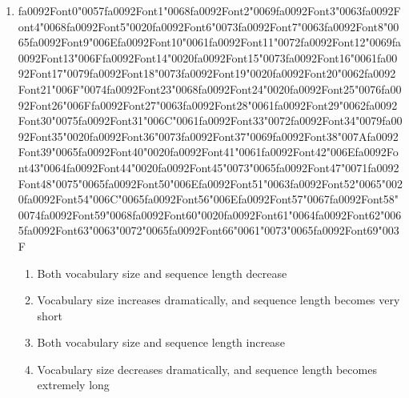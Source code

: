 \documentclass[12pt]{article}
\begin{document}
\begin{enumerate}[label=Q\arabic*.]
 \item {\csname fa0092Font0\endcsname\char"0057}{\csname fa0092Font1\endcsname\char"0068}{\csname fa0092Font2\endcsname\char"0069}{\csname fa0092Font3\endcsname\char"0063}{\csname fa0092Font4\endcsname\char"0068}{\csname fa0092Font5\endcsname\char"0020}{\csname fa0092Font6\endcsname\char"0073}{\csname fa0092Font7\endcsname\char"0063}{\csname fa0092Font8\endcsname\char"0065}{\csname fa0092Font9\endcsname\char"006E}{\csname fa0092Font10\endcsname\char"0061}{\csname fa0092Font11\endcsname\char"0072}{\csname fa0092Font12\endcsname\char"0069}{\csname fa0092Font13\endcsname\char"006F}{\csname fa0092Font14\endcsname\char"0020}{\csname fa0092Font15\endcsname\char"0073}{\csname fa0092Font16\endcsname\char"0061}{\csname fa0092Font17\endcsname\char"0079}{\csname fa0092Font18\endcsname\char"0073}{\csname fa0092Font19\endcsname\char"0020}{\csname fa0092Font20\endcsname\char"0062}{\csname fa0092Font21\endcsname\char"006F}{\char"0074}{\csname fa0092Font23\endcsname\char"0068}{\csname fa0092Font24\endcsname\char"0020}{\csname fa0092Font25\endcsname\char"0076}{\csname fa0092Font26\endcsname\char"006F}{\csname fa0092Font27\endcsname\char"0063}{\csname fa0092Font28\endcsname\char"0061}{\csname fa0092Font29\endcsname\char"0062}{\csname fa0092Font30\endcsname\char"0075}{\csname fa0092Font31\endcsname\char"006C}{\char"0061}{\csname fa0092Font33\endcsname\char"0072}{\csname fa0092Font34\endcsname\char"0079}{\csname fa0092Font35\endcsname\char"0020}{\csname fa0092Font36\endcsname\char"0073}{\csname fa0092Font37\endcsname\char"0069}{\csname fa0092Font38\endcsname\char"007A}{\csname fa0092Font39\endcsname\char"0065}{\csname fa0092Font40\endcsname\char"0020}{\csname fa0092Font41\endcsname\char"0061}{\csname fa0092Font42\endcsname\char"006E}{\csname fa0092Font43\endcsname\char"0064}{\csname fa0092Font44\endcsname\char"0020}{\csname fa0092Font45\endcsname\char"0073}{\char"0065}{\csname fa0092Font47\endcsname\char"0071}{\csname fa0092Font48\endcsname\char"0075}{\char"0065}{\csname fa0092Font50\endcsname\char"006E}{\csname fa0092Font51\endcsname\char"0063}{\csname fa0092Font52\endcsname\char"0065}{\char"0020}{\csname fa0092Font54\endcsname\char"006C}{\char"0065}{\csname fa0092Font56\endcsname\char"006E}{\csname fa0092Font57\endcsname\char"0067}{\csname fa0092Font58\endcsname\char"0074}{\csname fa0092Font59\endcsname\char"0068}{\csname fa0092Font60\endcsname\char"0020}{\csname fa0092Font61\endcsname\char"0064}{\csname fa0092Font62\endcsname\char"0065}{\csname fa0092Font63\endcsname\char"0063}{\char"0072}{\char"0065}{\csname fa0092Font66\endcsname\char"0061}{\char"0073}{\char"0065}{\csname fa0092Font69\endcsname\char"003F}
 \begin{enumerate}[label=(\Alph*)]
     \item Both vocabulary size and sequence length decrease
     \item Vocabulary size increases dramatically, and sequence length becomes very short
     \item Both vocabulary size and sequence length increase
     \item Vocabulary size decreases dramatically, and sequence length becomes extremely long
 \end{enumerate}
 

\end{enumerate}
\end{document}
